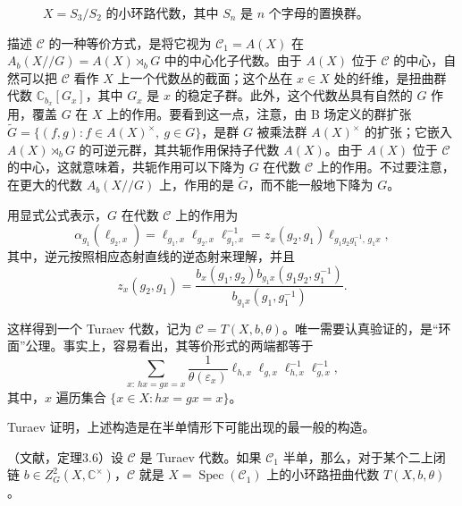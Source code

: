 \begin{figure}[H]
\centering
{}
\caption{$X=S_3/S_2$ 的小环路代数，其中 $S_n$ 是 $n$ 个字母的置换群。}\label{fig:2.23}
\end{figure}

描述 $\mathcal{C}$ 的一种等价方式，是将它视为 $\mathcal{C}_1=A(X)$ 在 $A_b(X//G)=A(X)\rtimes_bG$ 中的中心化子代数。由于 $A(X)$ 位于 $\mathcal{C}$ 的中心，自然可以把 $\mathcal{C}$ 看作 $X$ 上一个代数丛的截面；这个丛在 $x\in X$ 处的纤维，是扭曲群代数 $\mathbb{C}_{b_x}[G_x]$，其中 $G_x$ 是 $x$ 的稳定子群。此外，这个代数丛具有自然的 $G$ 作用，覆盖 $G$ 在 $X$ 上的作用。要看到这一点，注意，由 B 场定义的群扩张 $\widetilde{G}=\{(f,g):f\in A(X)^{\times},\ g\in G\}$，是群 $G$ 被乘法群 $A(X)^{\times}$ 的扩张；它嵌入 $A(X)\rtimes_bG$ 的可逆元群，其共轭作用保持子代数 $A(X)$。由于 $A(X)$ 位于 $\mathcal{C}$ 的中心，这就意味着，共轭作用可以下降为 $G$ 在代数 $\mathcal{C}$ 上的作用。不过要注意，在更大的代数 $A_b(X//G)$ 上，作用的是 $\widetilde{G}$，而不能一般地下降为 $G$。

用显式公式表示，$G$ 在代数 $\mathcal{C}$ 上的作用为
\begin{equation}\label{eq:2.94}
\alpha_{g_1}(\ell_{g_2,x})
=\ell_{g_1,x}\ell_{g_2,x}\ell_{g_1,x}^{-1}
=z_x(g_2,g_1)\ell_{g_1g_2g_1^{-1},\,g_1x},
\end{equation}
其中，逆元按照相应态射直线的逆态射来理解，并且
\begin{equation}\label{eq:2.95}
z_x(g_2,g_1)=
\frac{b_x(g_1,g_2)b_{g_1x}(g_1g_2,g_1^{-1})}{b_{g_1x}(g_1,g_1^{-1})}.
\end{equation}

这样得到一个 Turaev 代数，记为 $\mathcal{C}=T(X,b,\theta)$。唯一需要认真验证的，是“环面”公理。事实上，容易看出，其等价形式的两端都等于
\[
\sum_{x:\,hx=gx=x}\frac{1}{\theta(\varepsilon_x)}
\ell_{h,x}\ell_{g,x}\ell_{h,x}^{-1}\ell_{g,x}^{-1},
\]
其中，$x$ 遍历集合 $\{x\in X:hx=gx=x\}$。

Turaev 证明，上述构造是在半单情形下可能出现的最一般的构造。

\begin{theorem}\label{thm:2.13}
（文献，定理3.6）设 $\mathcal{C}$ 是 Turaev 代数。如果 $\mathcal{C}_1$ 半单，那么，对于某个二上闭链 $b\in Z_G^2(X,\mathbb{C}^{\times})$，$\mathcal{C}$ 就是 $X=\operatorname{Spec}(\mathcal{C}_1)$ 上的小环路扭曲代数 $T(X,b,\theta)$。
\end{theorem}

